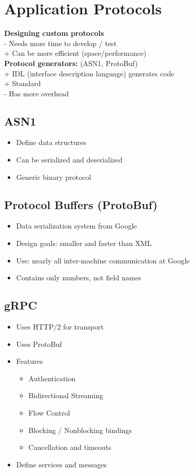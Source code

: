 
\section{Application Protocols}
\textbf{Designing custom protocols}\\
- Needs more time to develop / test\\
+ Can be more efficient (space/performance)\\
\textbf{Protocol generators:} (ASN1, ProtoBuf)\\
+ IDL (interface description language) generates code\\
+ Standard\\
- Has more overhead\\

\subsection{ASN1}
\begin{itemize}
    \item Define data structures
    \item Can be serialized and deserialized
    \item Generic binary protocol
\end{itemize}

\subsection{Protocol Buffers (ProtoBuf)}
\begin{itemize}
    \item Data serialization system from Google
    \item Design goals: smaller and faster than XML
    \item Use: nearly all inter-machine communication at Google
    \item Contains only numbers, not field names
\end{itemize}

\subsection{gRPC}
\begin{itemize}
    \item Uses HTTP/2 for transport
    \item Uses ProtoBuf
    \item Features
    \begin{itemize}
        \item Authentication
        \item Bidirectional Streaming
        \item Flow Control
        \item Blocking / Nonblocking bindings
        \item Cancellation and timeouts
    \end{itemize}
    \item Define services and messages
\end{itemize}

